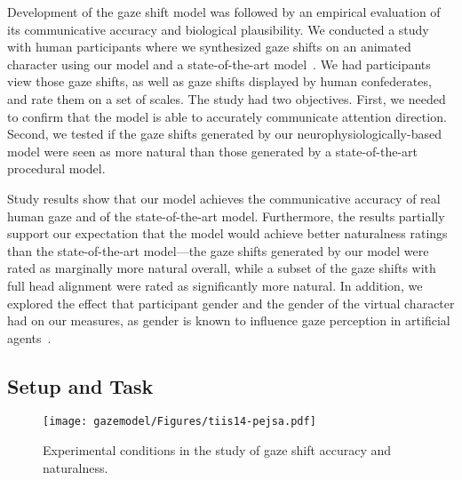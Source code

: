 Development of the gaze shift model was followed by an empirical evaluation of its communicative accuracy and biological plausibility. We conducted a study with human participants where we synthesized gaze shifts on an animated character using our model and a state-of-the-art model~\cite{peters2010animating}. We had participants view those gaze shifts, as well as gaze shifts displayed by human confederates, and rate them on a set of scales. The study had two objectives. First, we needed to confirm that the model is able to accurately communicate attention direction. Second, we tested if the gaze shifts generated by our neurophysiologically-based model were seen as more natural than those generated by a state-of-the-art procedural model.

Study results show that our model achieves the communicative accuracy of real human gaze and of the state-of-the-art model. Furthermore, the results partially support our expectation that the model would achieve better naturalness ratings than the state-of-the-art model---the gaze shifts generated by our model were rated as marginally more natural overall, while a subset of the gaze shifts with full head alignment were rated as significantly more natural. In addition, we explored the effect that participant gender and the gender of the virtual character had on our measures, as gender is known to influence gaze perception in artificial agents~\cite{mutlu2006storytelling}.

\subsection{Setup and Task}

\begin{figure}[t]
  \centering
  \texttt{[image: gazemodel/Figures/tiis14-pejsa.pdf]}
  \caption{Experimental conditions in the study of gaze shift accuracy and naturalness.}
  \label{fig:ModelEvalSetup}
\end{figure}

